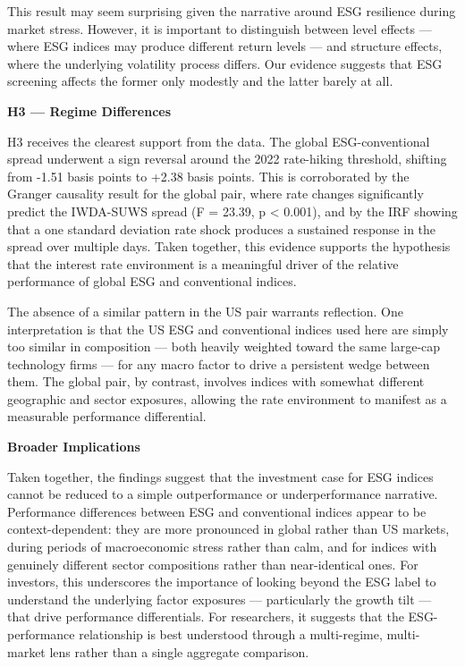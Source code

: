 \documentclass[
]{article}
\begin{document}
This result may seem surprising given the narrative around ESG
resilience during market stress. However, it is important to distinguish
between level effects --- where ESG indices may produce different return
levels --- and structure effects, where the underlying volatility
process differs. Our evidence suggests that ESG screening affects the
former only modestly and the latter barely at all.

\textbf{H3 --- Regime Differences}

H3 receives the clearest support from the data. The global
ESG-conventional spread underwent a sign reversal around the 2022
rate-hiking threshold, shifting from -1.51 basis points to +2.38 basis
points. This is corroborated by the Granger causality result for the
global pair, where rate changes significantly predict the IWDA-SUWS
spread (F = 23.39, p \textless{} 0.001), and by the IRF showing that a
one standard deviation rate shock produces a sustained response in the
spread over multiple days. Taken together, this evidence supports the
hypothesis that the interest rate environment is a meaningful driver of
the relative performance of global ESG and conventional indices.

The absence of a similar pattern in the US pair warrants reflection. One
interpretation is that the US ESG and conventional indices used here are
simply too similar in composition --- both heavily weighted toward the
same large-cap technology firms --- for any macro factor to drive a
persistent wedge between them. The global pair, by contrast, involves
indices with somewhat different geographic and sector exposures,
allowing the rate environment to manifest as a measurable performance
differential.

\textbf{Broader Implications}

Taken together, the findings suggest that the investment case for ESG
indices cannot be reduced to a simple outperformance or underperformance
narrative. Performance differences between ESG and conventional indices
appear to be context-dependent: they are more pronounced in global
rather than US markets, during periods of macroeconomic stress rather
than calm, and for indices with genuinely different sector compositions
rather than near-identical ones. For investors, this underscores the
importance of looking beyond the ESG label to understand the underlying
factor exposures --- particularly the growth tilt --- that drive
performance differentials. For researchers, it suggests that the
ESG-performance relationship is best understood through a multi-regime,
multi-market lens rather than a single aggregate comparison.
\end{document}
